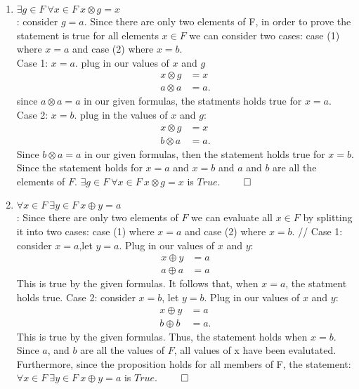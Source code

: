 \documentclass[11pt,twoside]{amsart}
\theoremstyle{definition}
\begin{document}
\begin{enumerate}[label= 2.\arabic*, itemsep=0.4cm]
        \item %
          $\exists g \in F \ \forall  x \in F \ x\otimes g = x $ \medskip \\
          : consider $g=a$. Since there are only two elements of F, in order to prove the statement is true for all elements $x \in F$ we can consider two cases: case (1) where $x=a$ and case (2) where $x=b$. \medskip \\
          Case 1: $x=a$. plug in our values of $x$ and $g$
           \begin{align*}
              x \otimes g &= x\\
              a \otimes a &= a.
            \end{align*}
            since $a \otimes a =a$ in our given formulas, the statments holds true for $x=a$.\medskip \\
            Case 2: $x=b$. plug in the values of $x$ and $g$:
          \begin{align*}
            x \otimes g &= x\\
            b \otimes a &= a.
          \end{align*}
          Since $b \otimes a =a$ in our given formulas, then the statement holds true for $x=b$.\medskip \\
          Since the statement holds for $x=a$ and $x=b$ and $a$ and $b$ are all the elements of $F$. $\exists g \in F \ \forall  x \in F \ x\otimes g = x $ is $True$. $\qed$ 




        \item %
          $\forall x \in F \ \exists y \in F \ x \oplus y = a $ \medskip \\
          : Since there are only two elements of $F$ we can evaluate all $x \in F$ by splitting it into two cases: case (1) where $x=a$ and case (2) where $x=b$. \medskip //
          Case 1: consider $x=a$,let $y=a$. Plug in our values of $x$ and $y$:
          \begin{align*}
            x \oplus y &= a\\
            a \oplus a &= a
          \end{align*}
          This is true by the given formulas. It follows that, when $x=a$, the statment holds true.
          Case 2: consider $x=b$, let $y=b$. Plug in our values of $x$ and $y$:
          \begin{align*}
            x \oplus y &= a \\
            b \oplus b &= a.
          \end{align*}
         This is true by the given formulas. Thus, the statement holds when $x=b$.\\
         Since $a$, and $b$ are all the values of $F$, all values of x have been evalutated. \\Furthermore, since the proposition holds for all members of F, the statement: \\ $\forall x \in F \ \exists y \in F \ x \oplus y = a $ is $True$. $\qed$ 
          

    \end{enumerate}
\end{document}

